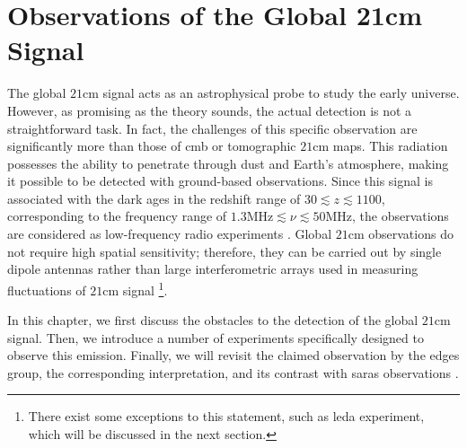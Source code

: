\documentclass[12pt, TexShade, letterpaper]{report}
\begin{document}
\chapter{Observations of the Global 21cm Signal}
\label{chap:observations}
The global $\mathrm{21cm}$ signal acts as an astrophysical probe to study the early universe. However, as promising as the theory sounds, the actual detection is not a straightforward task. In fact, the challenges of this specific observation are significantly more than those of \gls{cmb} or tomographic $\mathrm{21cm}$ maps. 
This radiation possesses the ability to penetrate through dust and Earth's atmosphere, making it possible to be detected with ground-based observations. Since this signal is associated with the dark ages in the redshift range of $30 \lesssim z \lesssim 1100$, corresponding to the frequency range of $\mathrm{1.3 MHz}\lesssim \nu \lesssim \mathrm{50 MHz}$, the observations are considered as low-frequency radio experiments \cite{thesis_pamela, thesis_moso}.
Global $\mathrm{21cm}$ observations do not require high spatial sensitivity; therefore, they can be carried out by single dipole antennas rather than large interferometric arrays used in measuring fluctuations of $\mathrm{21cm}$ signal \cite{thesis_shedding} \footnote{There exist some exceptions to this statement, such as \gls{leda} experiment, which will be discussed in the next section.}.\par
In this chapter, we first discuss the obstacles to the detection of the global $\mathrm{21cm}$ signal. Then, we introduce a number of experiments specifically designed to observe this emission. Finally, we will revisit the claimed observation by the \gls{edges} group, the corresponding interpretation, and its contrast with \gls{saras} observations \cite{saras_curse_edges}.
\end{document}
